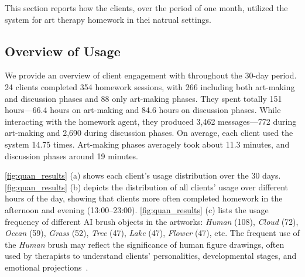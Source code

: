 This section reports how the clients, over the period of one month, utilized the \name{} system for art therapy homework in thei natrual settings.

\subsection{Overview of Usage}

We provide an overview of client engagement with \name{} throughout the 30-day period. 24 clients completed 354 homework sessions, with 266 including both art-making and discussion phases and 88 only art-making phases. They spent totally 151 hours---66.4 hours on art-making and 84.6 hours on discussion phases. While interacting with the homework agent, they produced 3,462 messages---772 during art-making and 2,690 during discussion phases. On average, each client used the system 14.75 times. Art-making phases averagely took about 11.3 minutes, and discussion phases around 19 minutes.

\autoref{fig:quan_results} (a) shows each client's usage distribution over the 30 days. 
\autoref{fig:quan_results} (b) depicts the distribution of all clients' usage over different hours of the day, showing that clients more often completed homework in the afternoon and evening (13:00–23:00). 
\autoref{fig:quan_results} (c) lists the usage frequency of different AI brush objects in the artworks: \textit{Human} (108), \textit{Cloud} (72), \textit{Ocean} (59), \textit{Grass} (52), \textit{Tree} (47), \textit{Lake} (47), \textit{Flower} (47), etc. The frequent use of the \textit{Human} brush may reflect the significance of human figure drawings, often used by therapists to understand clients' personalities, developmental stages, and emotional projections~\cite{malchiodi2007art}.


